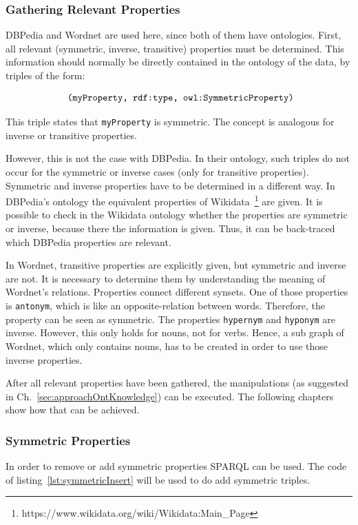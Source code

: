 \subsubsection{Gathering Relevant Properties}
DBPedia and Wordnet are used here, since both of them have ontologies. First, all relevant (symmetric, inverse, transitive) properties must be determined. This information should normally be directly contained in the ontology of the data, by triples of the form:

\[
\text{ {\tt (myProperty, rdf:type, owl:SymmetricProperty)}}
\] 

This triple states that {\tt myProperty} is symmetric. The concept is analogous for inverse or transitive properties. 

However, this is not the case with DBPedia. In their ontology, such triples do not occur for the symmetric or inverse cases (only for transitive properties). Symmetric and inverse properties have to be determined in a different way. In DBPedia's ontology the equivalent properties of Wikidata~\footnote{https://www.wikidata.org/wiki/Wikidata:Main\_Page} are given. It is possible to check in the Wikidata ontology whether the properties are symmetric or inverse, because there the information is given. Thus, it can be  back-traced which DBPedia properties are relevant.

In Wordnet, transitive properties are explicitly given, but symmetric and inverse are not. It is necessary to determine them by understanding the meaning of Wordnet's relations. Properties connect different synsets. One of those properties is {\tt antonym}, which is like an opposite-relation between words. Therefore, the property can be seen as symmetric. The properties {\tt hypernym} and {\tt hyponym} are inverse. However, this only holds for nouns, not for verbs. Hence, a sub graph of Wordnet, which only contains nouns, has to be created in order to use those inverse properties.

After all relevant properties have been gathered, the manipulations (as suggested in Ch.~\ref{sec:approachOntKnowledge}) can be executed. The following chapters show how that can be achieved.

\subsubsection{Symmetric Properties}

In order to remove or add symmetric properties SPARQL can be used. The code of listing~\ref{lst:symmetricInsert} will be used to do add symmetric triples.

